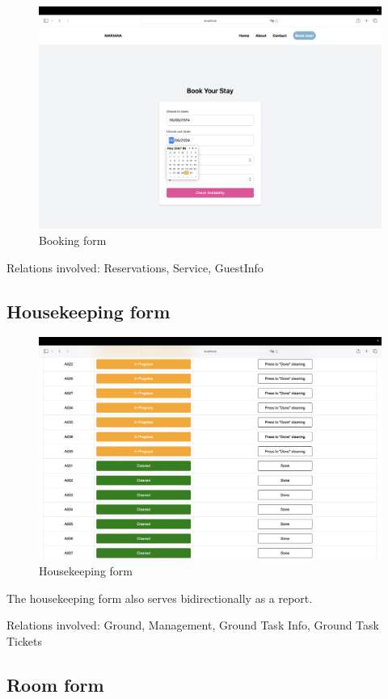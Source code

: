 \begin{figure}[h]
	\centerline
	{\includegraphics[width=12cm]{fig/4_book}}
	\caption{Booking form}
\end{figure}

Relations involved: Reservations, Service, GuestInfo

\subsection{Housekeeping form}

\begin{figure}[h]
	\centerline
	{\includegraphics[width=12cm]{fig/1_house}}
	\caption{Housekeeping form}
\end{figure} 

The housekeeping form also serves bidirectionally as a report.

Relations involved: Ground, Management, Ground Task Info, Ground Task Tickets

\subsection{Room form}

